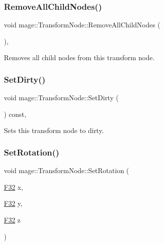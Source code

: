 \subsubsection{\texorpdfstring{Remove\+All\+Child\+Nodes()}{RemoveAllChildNodes()}}
{\footnotesize\ttfamily void mage\+::\+Transform\+Node\+::\+Remove\+All\+Child\+Nodes (\begin{DoxyParamCaption}{ }\end{DoxyParamCaption})\hspace{0.3cm}{\ttfamily [private]}, {\ttfamily [noexcept]}}

Removes all child nodes from this transform node. \hypertarget{classmage_1_1_transform_node_aef6e402c69bb125b09925b7a5ca79b33}{}\label{classmage_1_1_transform_node_aef6e402c69bb125b09925b7a5ca79b33} 
\subsubsection{\texorpdfstring{Set\+Dirty()}{SetDirty()}}
{\footnotesize\ttfamily void mage\+::\+Transform\+Node\+::\+Set\+Dirty (\begin{DoxyParamCaption}{ }\end{DoxyParamCaption}) const\hspace{0.3cm}{\ttfamily [private]}, {\ttfamily [noexcept]}}

Sets this transform node to dirty. \hypertarget{classmage_1_1_transform_node_ac87418dfcbc516056657a5ebe8d02ed6}{}\label{classmage_1_1_transform_node_ac87418dfcbc516056657a5ebe8d02ed6} 
\subsubsection{\texorpdfstring{Set\+Rotation()}{SetRotation()}\hspace{0.1cm}{\footnotesize\ttfamily [1/3]}}
{\footnotesize\ttfamily void mage\+::\+Transform\+Node\+::\+Set\+Rotation (\begin{DoxyParamCaption}\item[{\hyperlink{namespacemage_aa97e833b45f06d60a0a9c4fc22ae02c0}{F32}}]{x,  }\item[{\hyperlink{namespacemage_aa97e833b45f06d60a0a9c4fc22ae02c0}{F32}}]{y,  }\item[{\hyperlink{namespacemage_aa97e833b45f06d60a0a9c4fc22ae02c0}{F32}}]{z }\end{DoxyParamCaption})\hspace{0.3cm}{\ttfamily [noexcept]}}

